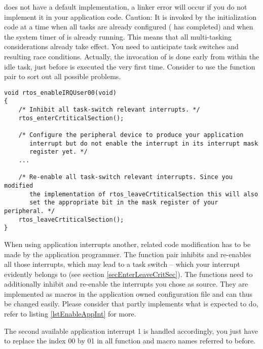  does not have a default implementation, a
linker error will occur if you do not implement it in your application
code. Caution: It is invoked by the \rtos{} initialization code at a time
when all tasks are already configured ( has completed) and
when the system timer of \rtos{} is already running. This means that all
multi-tasking considerations already take effect. You need to anticipate
task switches and resulting race conditions. Actually, the invocation of
 is done early from within the idle task,
just before  is executed the very first time. Consider to use
the function pair  to
sort out all possible problems.

\begin{lstlisting}[float, caption={Initialization of an application interrupt},
label=lstEnableAppInt, captionpos=b]
void rtos_enableIRQUser00(void)
{
    /* Inhibit all task-switch relevant interrupts. */
    rtos_enterCrtiticalSection();
    
    /* Configure the peripheral device to produce your application
       interrupt but do not enable the interrupt in its interrupt mask
       register yet. */
    ...
    
    /* Re-enable all task-switch relevant interrupts. Since you modified 
       the implementation of rtos_leaveCrtiticalSection this will also
       set the appropriate bit in the mask register of your peripheral. */
    rtos_leaveCrtiticalSection();
}
\end{lstlisting}

When using application interrupts another, related code modification has
to be made by the application programmer. The function pair
 inhibits and
re-enables all those interrupts, which may lead to a task switch -- which
your interrupt evidently belongs to (see section
\ref{secEnterLeaveCritSec}). The functions need to additionally inhibit
and re-enable the interrupts you chose as source. They are implemented as
macros in the application owned configuration file  and
can thus be changed easily. Please consider that
 partly implements what
 is expected to do, refer to listing
\ref{lstEnableAppInt} for more.

The second available application interrupt 1 is handled accordingly, you
just have to replace the index 00 by 01 in all function and macro names
referred to before.


